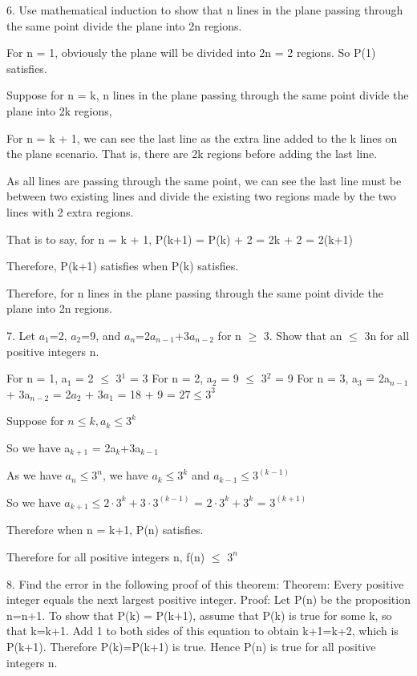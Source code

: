 \documentclass{article}
\begin{document}
\begin{large}
6. Use mathematical induction to show that n lines in the plane passing through the same point divide the plane into 2n regions.

For n = 1, obviously the plane will be divided into 2n = 2 regions. So P(1) satisfies.

Suppose for n = k, n lines in the plane passing through the same point divide the plane into 2k regions,

For n = k + 1, we can see the last line as the extra line added to the k lines on the plane scenario. 
That is, there are 2k regions before adding the last line.

As all lines are passing through the same point, we can see the last line must be between two existing lines and divide the existing two regions made by the two lines with 2 extra regions.

That is to say, for n = k + 1, P(k+1) = P(k) + 2 = 2k + 2 = 2(k+1)

Therefore, P(k+1) satisfies when P(k) satisfies.

Therefore, for n lines in the plane passing through the same point divide the plane into 2n regions.

7. Let $a_{1}$=2, $a_{2}$=9, and $a_{n}$=2$a_{n-1}$+3$a_{n-2}$ for n $\ge$ 3. Show that an $\le$ 3n for all positive integers n. 

For n = 1, a$_{1}$ = 2 $\le$ 3$^{1}$ = 3
For n = 2, a$_{2}$ = 9 $\le$ 3$^{2}$ = 9
For n = 3, a$_{3}$ = 2a$_{n-1}$ + 3a$_{n-2}$
                   = 2$a_{2}$ + 3$a_{1}$
                   = 18 + 9
                   = $27 \le 3^3$

Suppose for $n \le k, a_{k} \le 3^k$

So we have a$_{k+1}$ = 2a$_{k}$+3a$_{k-1}$ 

As we have $a_{n} \le 3^n$, we have $a_{k} \le 3^k$ and $a_{k-1} \le 3^(k-1)$

So we have $a_{k+1} \le 2 \cdot 3^k + 3 \cdot 3^(k-1)$
                     =  $2 \cdot 3^k + 3^k$
                     =  $3^(k+1)$

Therefore when n = k+1, P(n) satisfies.

Therefore for all positive integers n, f(n) $\le$ $3^n$

8. Find the error in the following proof of this theorem:
Theorem: Every positive integer equals the next largest positive integer.
Proof: Let P(n) be the proposition n=n+1. To show that P(k) = P(k+1), assume that P(k) is true for some k, so that k=k+1. Add 1 to both sides of this equation to obtain k+1=k+2, which is P(k+1). Therefore P(k)=P(k+1) is true. Hence P(n) is true for all positive integers n.


\end{large}
\end{document}
